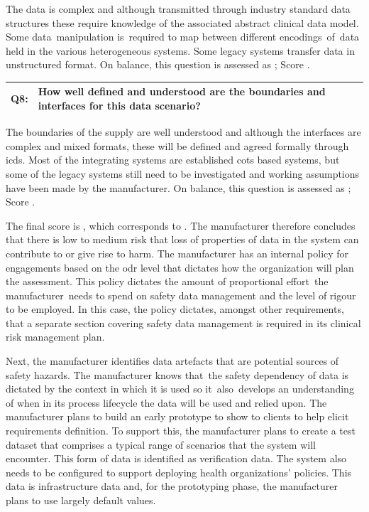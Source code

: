 The data is complex and although transmitted through industry standard data structures these require knowledge of the associated abstract clinical data model. Some data\cbstart\ manipulation is\cbend\ required to map between different encodings\cbstart\ of\cbend\ data held in the various heterogeneous systems. Some legacy systems transfer data in unstructured format. On balance, this question is assessed as ; Score .

\addtocounter{table}{-1} %
\begin{longtable*}[H]
	{|L{}|L{}|}
	\hline
	Q8: & How well defined and understood are the boundaries and interfaces for this data scenario?\\
	\hline
\end{longtable*}
The boundaries of the supply are well understood and although the interfaces are complex and mixed formats, these will be defined and agreed formally through \glspl{icd}. Most of the integrating systems are established \gls{cots} based systems, but some of the legacy systems still need to be investigated and working assumptions have been
made by the manufacturer. On balance, this question is assessed as ; Score .

The final score is , which corresponds to . The manufacturer therefore concludes that there is low to medium risk that loss of properties of data in the system can contribute to or give rise to harm. The manufacturer has an internal policy for engagements based on the \gls{odr} level that dictates how the organization will plan the assessment. This policy dictates the amount of proportional effort\cbstart\ the manufacturer\cbend\ needs to spend on safety data management and the level of rigour to be employed. In this case, the policy dictates, amongst other requirements, that a separate section covering safety data management is required in its clinical risk management plan.

\cbstart Next, the manufacturer identifies \glspl{data artefact} that are potential sources of safety hazards. The manufacturer knows that\cbend\ the safety dependency of data is dictated by the context in which it is used so it\cbstart\ also\cbend\ develops an understanding of when in its process lifecycle the data will be used and relied upon. The manufacturer plans to build an early prototype to show to clients to help elicit requirements definition. To support this, the manufacturer plans to create a test \gls{dataset} that comprises a typical range of scenarios that the system will encounter. This form of data is identified as \gls{verification} data. The system also needs to be configured to support deploying health organizations' policies. This data is infrastructure data and, for the prototyping phase, the manufacturer plans to use largely default values.

